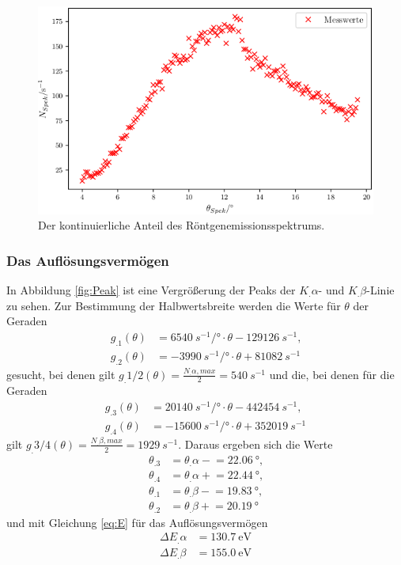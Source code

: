 \begin{figure}
\centering
\includegraphics[width=\linewidth-70pt,height=\textheight-70pt,keepaspectratio]{content/images/konstSpektrum.png}
\caption{Der kontinuierliche Anteil des Röntgenemissionsspektrums.}
\label{fig:brems}
\end{figure}


\subsubsection{Das Auflösungsvermögen}

In Abbildung \ref{fig:Peak} ist eine Vergrößerung der Peaks der $K_.{\alpha}$- und $K_.{\beta}$-Linie zu sehen.
Zur Bestimmung der Halbwertsbreite werden die Werte für $\theta$ der Geraden
\begin{align*}
g_.1(\theta)&=\SI{6540}{s^{-1}\per\degree}\cdot\theta-\SI{129126}{s^{-1}}\text{,}\\
g_.2(\theta)&=\SI{-3990}{s^{-1}\per\degree}\cdot\theta+\SI{81082}{s^{-1}}
\end{align*}
gesucht, bei denen gilt $g_.{1/2}(\theta)=\frac{N_.{\alpha,max}}{2}=\SI{540}{s^{-1}}$\newline
und die, bei denen für die Geraden
\begin{align*}
g_.3(\theta)&=\SI{20140}{s^{-1}\per\degree}\cdot\theta-\SI{442454}{s^{-1}}\text{,}\\
g_.4(\theta)&=\SI{-15600}{s^{-1}\per\degree}\cdot\theta+\SI{352019}{s^{-1}}
\end{align*}
gilt $g_.{3/4}(\theta)=\frac{N_.{\beta,max}}{2}=\SI{1929}{s^{-1}}$.\newline
Daraus ergeben sich die Werte
\begin{align*}
\theta_.3&=\theta_.{\alpha-}=\SI{22,06}{\degree}\text{,}\\
\theta_.4&=\theta_.{\alpha+}=\SI{22,44}{\degree}\text{,}\\
\theta_.1&=\theta_.{\beta-}=\SI{19,83}{\degree}\text{,}\\
\theta_.2&=\theta_.{\beta+}=\SI{20,19}{\degree}
\end{align*}
und mit Gleichung \eqref{eq:E} für das Auflösungsvermögen
\begin{align*}
\Delta E_.{\alpha}&=\SI{130,7}{\eV}\\
\Delta E_.{\beta}&=\SI{155,0}{\eV}
\end{align*}

